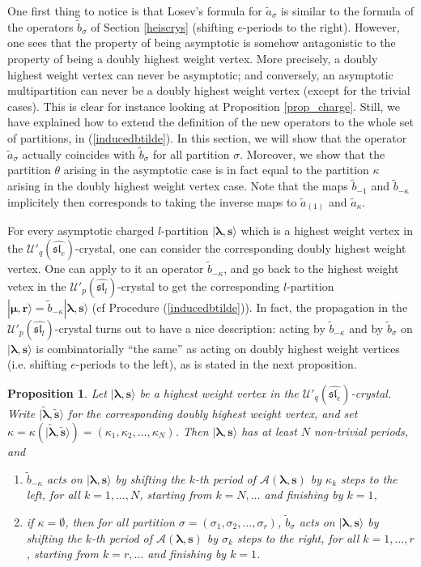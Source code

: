 \documentclass[twoside,12pt]{amsart}
\theoremstyle{plain}
\newcommand{\cA}{\mathcal{A}}
\newcommand{\br}{\mathbf{r}}
\newcommand{\bs}{\mathbf{s}}
\newcommand{\si}{\sigma}
\newcommand{\la}{\lambda}
\newcommand{\ka}{\kappa}
\newcommand{\bla}{\boldsymbol{\la}}
\newcommand{\bmu}{\boldsymbol{\mu}}
\newcommand{\ta}{\tilde{a}}
\newcommand{\tb}{\tilde{b}}
\newcommand{\tbla}{\tilde{\bla}}
\newcommand{\tbs}{\tilde{\bs}}
\newcommand{\Ue}{\mathcal{U}'_q (\widehat{\mathfrak{sl}_e})}
\newcommand{\Ul}{\mathcal{U}'_p (\widehat{\mathfrak{sl}_l})}
\newtheorem{prop}[num]{Proposition}
\theoremstyle{remark}
\begin{document}
One first thing to notice is that Losev's formula for $\ta_\si$ is 
similar to the formula of the operators $\tb_\si$ of Section \ref{heiscrys}
(shifting $e$-periods to the right).
However, one sees that the property of being asymptotic is somehow antagonistic to the property of being
a doubly highest weight vertex. More precisely, a doubly highest weight vertex can never be asymptotic;
and conversely, an asymptotic multipartition can never be a doubly highest weight vertex (except for the trivial cases).
This is clear for instance looking at Proposition \ref{prop_charge}.
Still, we have explained how to extend the definition of the new operators to the whole set of partitions, in (\ref{inducedbtilde}).
In this section, we will show that the operator $\ta_\si$ 
actually coincides with $\tb_\si$ for all partition $\si$.
Moreover, we show that the partition $\theta$ arising in the asymptotic case is in fact
equal to the partition $\ka$ arising in the doubly highest weight vertex case.
Note that the maps $\tb_{-1}$ and $\tb_{-\ka}$ implicitely then corresponds to 
taking the inverse maps to $\ta_{(1)}$ and $\ta_{\ka}$.

\medskip

For every asymptotic charged $l$-partition $|\bla,\bs\rangle$ which is a highest weight vertex in the $\Ue$-crystal, 
one can consider the corresponding doubly highest weight vertex. 
One can apply to it an operator $\tb_{-\ka}$, and go back to the highest weight vetex in the $\Ul$-crystal 
to get the corresponding $l$-partition $|\bmu,\br\rangle=\tb_{-\ka}|\bla,\bs\rangle$
(cf Procedure (\ref{inducedbtilde})).
In fact, the propagation in the $\Ul$-crystal turns out to have a nice description:
acting by $\tb_{-\ka}$  and by $\tb_\si$ on $|\bla,\bs\rangle$ is
combinatorially ``the same'' as acting on doubly highest weight vertices (i.e. shifting $e$-periods to the left), 
as is stated in the next proposition.


\begin{prop}\label{prop_losev_1}
Let $|\bla,\bs\rangle$ be a highest weight vertex in the $\Ue$-crystal.
Write $|{\tbla},\tbs\rangle$ for
the corresponding doubly highest weight vertex, and set $\ka=\ka(|{\tbla},\tbs\rangle)=(\ka_1,\ka_2,\dots,\ka_{N})$.
Then $|\bla,\bs\rangle$ has at least $N$ non-trivial periods, and
\begin{enumerate}
\item $\tb_{-\ka}$ acts on $|\bla,\bs\rangle$ by shifting the $k$-th period 
of $\cA(\bla,\bs)$ by $\ka_k$ steps to the left, for all $k=1,\dots,N$, 
starting from $k=N, \dots$ and finishing by $k=1$,
\item if $\ka=\emptyset$, then for all partition $\si=(\si_1,\si_2,\dots,\si_r)$, $\tb_{\si}$ acts on $|\bla,\bs\rangle$ 
by shifting the $k$-th period of $\cA(\bla,\bs)$ by $\si_k$ steps to the right, for all $k=1,\dots,r$, 
starting from $k=r, \dots$ and finishing by $k=1$.
\end{enumerate}
\end{prop}
\end{document}
